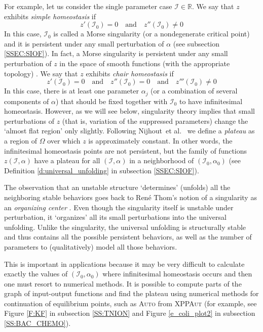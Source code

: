 \documentclass[a4paper,fleqn]{cas-dc}
\newcommand{\II}{{\mathcal I}}
\newcommand{\etal}{\textrm{et al.}}
\begin{document}
For example, let us consider the single parameter case $\II\in\mathbb{R}$.
We say that $z$ exhibits \emph{simple homeostasis} if
\begin{equation} \label{e:simple_homeostasis}
 z'(\II_0) = 0
 \quad\text{and}\quad 
 z''(\II_0) \neq 0
\end{equation}
In this case, $\II_0$ is called a Morse singularity (or a nondegenerate critical point) and it is persistent under any small perturbation of $\alpha$ (see subsection \ref{SSEC:SIOF}).
In fact, a Morse singularity is persistent under any small perturbation of $z$ in the space of smooth functions (with the appropriate topology) \cite{gg1973}. 
We say that $z$ exhibits \emph{chair homeostasis} if
\begin{equation} \label{e:chair_homeostasis}
 z'(\II_0) = 0
 \quad\text{and}\quad 
 z''(\II_0) = 0
 \quad\text{and}\quad 
 z'''(\II_0) \neq 0
\end{equation}
In this case, there is at least one parameter $\alpha_j$ (or a combination of several components of $\alpha$) that should be fixed together with $\II_0$ to have infinitesimal homeostasis. 
However, as we will see below, singularity theory implies that small perturbations of $z$ (that is, variation of the suppressed parameters) change the `almost flat region' only slightly.
Following Nijhout~\etal~\cite{nbr2014} we define a \emph{plateau} as a region of $\Omega$ over which $z$ is approximately constant.
In other words, the infinitesimal homeostasis points are not persistent, but the family of functions $z(\II,\alpha)$ have a plateau for all $(\II,\alpha)$ in a neighborhood of $(\II_0,\alpha_0)$ (see Definition \ref{d:universal_unfolding} in subsection \ref{SSEC:SIOF}). 

The observation that an unstable structure `determines' (unfolds) all the neighboring stable behaviors goes back to Ren\'{e} Thom's notion of a singularity as an \emph{organizing center} \cite{thom1975}.
Even though the singularity itself is unstable under perturbation, it `organizes' all its small perturbations into the universal unfolding. 
Unlike the singularity, the universal unfolding is structurally stable and thus contains all the possible persistent behaviors, as well as the number of parameters to (qualitatively) model all those behaviors.

This is important in applications because it may be very difficult to calculate exactly the values of $(\II_0,\alpha_0)$ where infinitesimal homeostasis occurs and then one must resort to numerical methods.
It is possible to compute parts of the graph of input-output functions and find the plateau using numerical methods for continuation of equilibrium points, such as \textsc{Auto} from \textsc{XPPAut} \cite{bard2002} (for example, see Figure \ref{F:KF} in subsection \ref{SS:TNION} and Figure \ref{e_coli_plot2} in subsection \ref{SS:BAC_CHEMO}).
\end{document}
